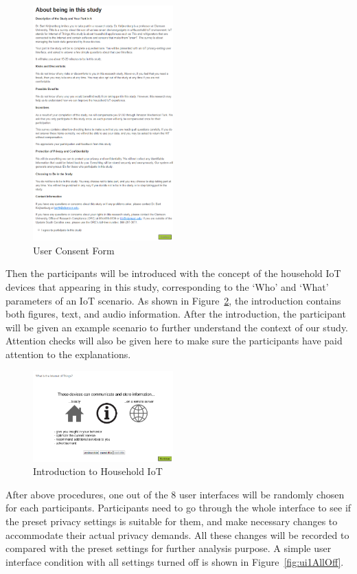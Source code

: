 \begin{figure}
	\centering
	\includegraphics[width=0.48\textwidth]{figures/userstudy2.png}
	\caption{User Consent Form}
	\label{fig:us2}
\end{figure}

Then the participants will be introduced with the concept of the household IoT devices that appearing in this study, corresponding to the `Who' and `What' parameters of an IoT scenario. As shown in Figure~\ref{fig:us3}, the introduction contains both figures, text, and audio information. After the introduction, the participant will be given an example scenario to further understand the context of our study. Attention checks will also be given here to make sure the participants have paid attention to the explanations.
\begin{figure}
	\centering
	\includegraphics[width=0.48\textwidth]{figures/userstudy3.png}
	\caption{Introduction to Household IoT}
	\label{fig:us3}
\end{figure}

After above procedures, one out of the 8 user interfaces will be randomly chosen for each participants. Participants need to go through the whole interface to see if the preset privacy settings is suitable for them, and make necessary changes to accommodate their actual privacy demands. All these changes will be recorded to compared with the preset settings for further analysis purpose. A simple user interface condition with all settings turned off is shown in Figure~\ref{fig:ui1AllOff}.

